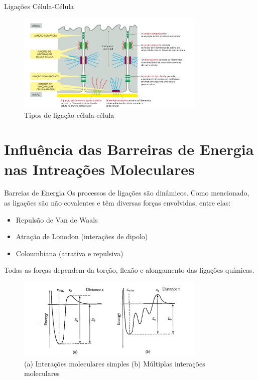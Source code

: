 \documentclass[aspectratio=169]{beamer}
\begin{document}
\begin{frame}{Ligações Célula-Célula}
    \begin{figure}
        \includegraphics[width=0.8\textwidth]{img/bio/celula_celula.jpg}
        \caption{Tipos de ligação célula-célula}
    \end{figure}
\end{frame}

\section{Influência das Barreiras de Energia nas Intreações Moleculares}
\begin{frame}{Barreias de Energia}
Os processos de ligações são dinâmicos. Como mencionado, as ligações são não covalentes e
têm diversas forças envolvidas, entre elas:
\begin{itemize}
    \item Repulsão de Van de Waals
    \item Atração de Lonodon (interações de dipolo)
    \item Coloumbiana (atrativa e repulsiva)
\end{itemize}
Todas as forças dependem da torção, flexão e alongamento das ligações químicas.
\end{frame}

\begin{frame}
    \begin{figure}\label{fig:barreiras-energia}
        \includegraphics[width=0.8\textwidth]{img/barreiras_energia.jpg}
        \caption{(a) Interações moleculares simples (b) Múltiplas interações moleculares}
    \end{figure}    
\end{frame}
\end{document}
